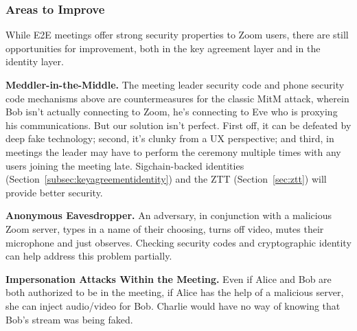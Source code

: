 \subsubsection{Areas to Improve}
While E2E meetings offer strong security properties to Zoom users, there are still opportunities for
improvement, both in the key agreement layer and in the identity layer.
\begin{description}
\item {\bf Meddler-in-the-Middle.} The meeting leader security code and phone security code
mechanisms above are countermeasures for the classic MitM attack, wherein Bob isn't
actually connecting to Zoom, he's connecting to Eve who is proxying his communications. But our
solution isn't perfect. First off, it can be defeated by deep fake technology; second, it's clunky
from a UX perspective; and third, in meetings the leader may have to perform the ceremony multiple
times with any users joining the meeting late. Sigchain-backed identities
(Section~\ref{subsec:keyagreementidentity}) and the ZTT (Section~\ref{sec:ztt}) will provide better
security.
\item {\bf Anonymous Eavesdropper.} An adversary, in conjunction with a malicious Zoom server, types
in a name of their choosing, turns off video, mutes their microphone and just observes. Checking
security codes and cryptographic identity can help address this problem partially.
\item {\bf Impersonation Attacks Within the Meeting.} Even if Alice and Bob are both authorized to
be in the meeting, if Alice has the help of a malicious server, she can inject audio/video for Bob.
Charlie would have no way of knowing that Bob's stream was being faked.
\end{description}
